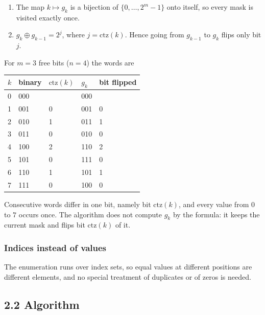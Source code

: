 \documentclass[
]{article}
\providecommand{\tightlist}{%
  \setlength{\itemsep}{0pt}\setlength{\parskip}{0pt}}
\begin{document}
\begin{enumerate}
\def\labelenumi{\arabic{enumi}.}
\tightlist
\item
  The map \(k \mapsto g_k\) is a bijection of \(\{0, \dots, 2^m - 1\}\)
  onto itself, so every mask is visited exactly once.
\item
  \(g_k \oplus g_{k-1} = 2^{j}\), where \(j = \mathrm{ctz}(k)\). Hence
  going from \(g_{k-1}\) to \(g_k\) flips only bit \(j\).
\end{enumerate}

For \(m = 3\) free bits (\(n = 4\)) the words are

\begin{longtable}[]{@{}lllll@{}}
\toprule
\(k\) & binary & \(\mathrm{ctz}(k)\) & \(g_k\) & bit flipped \\
\midrule
\endhead
0 & 000 &  & 000 &  \\
\midrule
1 & 001 & 0 & 001 & 0 \\
\midrule
2 & 010 & 1 & 011 & 1 \\
\midrule
3 & 011 & 0 & 010 & 0 \\
\midrule
4 & 100 & 2 & 110 & 2 \\
\midrule
5 & 101 & 0 & 111 & 0 \\
\midrule
6 & 110 & 1 & 101 & 1 \\
\midrule
7 & 111 & 0 & 100 & 0 \\
\bottomrule
\end{longtable}

Consecutive words differ in one bit, namely bit \(\mathrm{ctz}(k)\), and
every value from \(0\) to \(7\) occurs once. The algorithm does not
compute \(g_k\) by the formula: it keeps the current mask and flips bit
\(\mathrm{ctz}(k)\) of it.

\hypertarget{indices-instead-of-values}{%
\subsubsection{Indices instead of
values}\label{indices-instead-of-values}}

The enumeration runs over index sets, so equal values at different
positions are different elements, and no special treatment of duplicates
or of zeros is needed.

\hypertarget{algorithm}{%
\subsection{2.2 Algorithm}\label{algorithm}}
\end{document}
